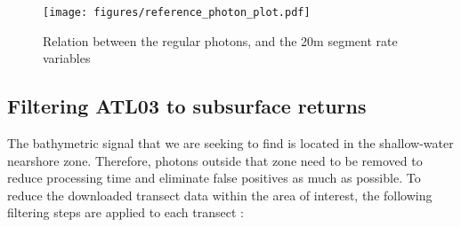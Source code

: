 \begin{figure}[h]
    \centering
    \texttt{[image: figures/reference\_photon\_plot.pdf]}
    \caption{Relation between the regular photons, and the 20m segment rate variables}
    \label{fig:reference-photon_match} 
\end{figure}

\subsection{Filtering ATL03 to subsurface returns}

The bathymetric signal that we are seeking to find is located in the shallow-water nearshore zone. Therefore, photons outside that zone need to be removed to reduce processing time and eliminate false positives as much as possible. To reduce the downloaded transect data within the area of interest, the following filtering steps are applied to each transect :

